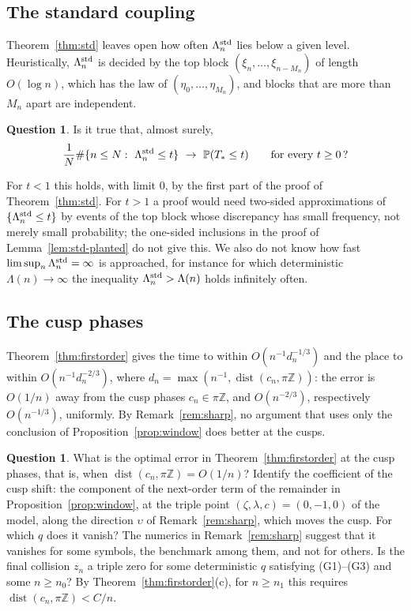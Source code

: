 \documentclass[11pt]{amsart}
\theoremstyle{definition}
\newtheorem{question}[theorem]{Question}
\theoremstyle{remark}
\numberwithin{equation}{section}
\newcommand{\Z}{\mathbb{Z}}
\newcommand{\PP}{\mathbb{P}}
\DeclareMathOperator{\dist}{dist}
\begin{document}
\subsection{The standard coupling}
Theorem~\ref{thm:std} leaves open how often $\Lambda_n^{\rm std}$ lies below a given level. Heuristically, $\Lambda_n^{\rm std}$ is decided by the top block $(\xi_n,\dots,\xi_{n-M_n})$ of length $O(\log n)$, which has the law of $(\eta_0,\dots,\eta_{M_n})$, and blocks that are more than $M_n$ apart are independent.

\begin{question}\label{q:ergodic}
Is it true that, almost surely,
\[
\frac1N\#\{n\le N:\ \Lambda_n^{\rm std}\le t\}\ \to\ \PP(T_*\le t)\qquad\text{for every }t\ge0\,?
\]
\end{question}

For $t<1$ this holds, with limit $0$, by the first part of the proof of Theorem~\ref{thm:std}. For $t>1$ a proof would need two-sided approximations of $\{\Lambda_n^{\rm std}\le t\}$ by events of the top block whose discrepancy has small frequency, not merely small probability; the one-sided inclusions in the proof of Lemma~\ref{lem:std-planted} do not give this. We also do not know how fast $\limsup_n\Lambda_n^{\rm std}=\infty$ is approached, for instance for which deterministic $\Lambda(n)\to\infty$ the inequality $\Lambda_n^{\rm std}>\Lambda(n)$ holds infinitely often.


\subsection{The cusp phases}
Theorem~\ref{thm:firstorder} gives the time to within $O(n^{-1}d_n^{-1/3})$ and the place to within $O(n^{-1}d_n^{-2/3})$, where $d_n=\max(n^{-1},\dist(c_n,\pi\Z))$: the error is $O(1/n)$ away from the cusp phases $c_n\in\pi\Z$, and $O(n^{-2/3})$, respectively $O(n^{-1/3})$, uniformly. By Remark~\ref{rem:sharp}, no argument that uses only the conclusion of Proposition~\ref{prop:window} does better at the cusps.

\begin{question}\label{q:cusp}
What is the optimal error in Theorem~\ref{thm:firstorder} at the cusp phases, that is, when $\dist(c_n,\pi\Z)=O(1/n)$? Identify the coefficient of the cusp shift: the component of the next-order term of the remainder in Proposition~\ref{prop:window}, at the triple point $(\zeta,\lambda,c)=(0,-1,0)$ of the model, along the direction $\upsilon$ of Remark~\ref{rem:sharp}, which moves the cusp. For which $q$ does it vanish? The numerics in Remark~\ref{rem:sharp} suggest that it vanishes for some symbols, the benchmark among them, and not for others. Is the final collision $z_n$ a triple zero for some deterministic $q$ satisfying (G1)--(G3) and some $n\ge n_0$? By Theorem~\ref{thm:firstorder}(c), for $n\ge n_1$ this requires $\dist(c_n,\pi\Z)<C/n$.
\end{question}
\end{document}
